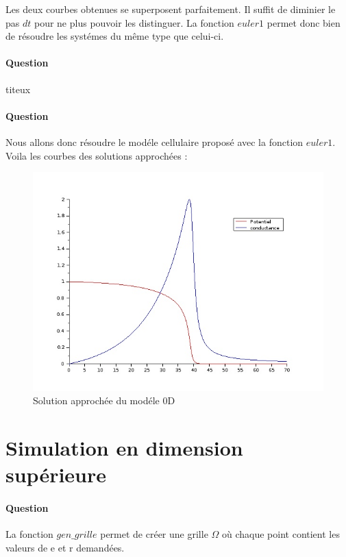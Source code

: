 \documentclass[11pt]{article}
\newcounter{question_num}
\begin{document}
	Les deux courbes obtenues se superposent parfaitement. Il suffit de diminier le pas $dt$ pour ne plus pouvoir les distinguer. La fonction $euler1$ permet donc bien de résoudre les systémes du même type que celui-ci.
	
	\paragraph{Question  \\}
 	titeux	

	\paragraph{Question  \\}
	Nous allons donc résoudre le modéle cellulaire proposé avec la fonction $euler1$. Voila les courbes des solutions approchées :
	\begin{figure}[H]
	\begin{center}
		\includegraphics[width=8 cm]{Solution0D.jpeg}
		\caption{ Solution approchée du modéle 0D }
	\end{center}
	\end{figure}
	
\section{Simulation en dimension supérieure}
	\paragraph{Question  \\}
	La fonction $gen\_grille$ permet de créer une grille $ \Omega $ où chaque point contient les valeurs de e et r demandées.


\end{document}
